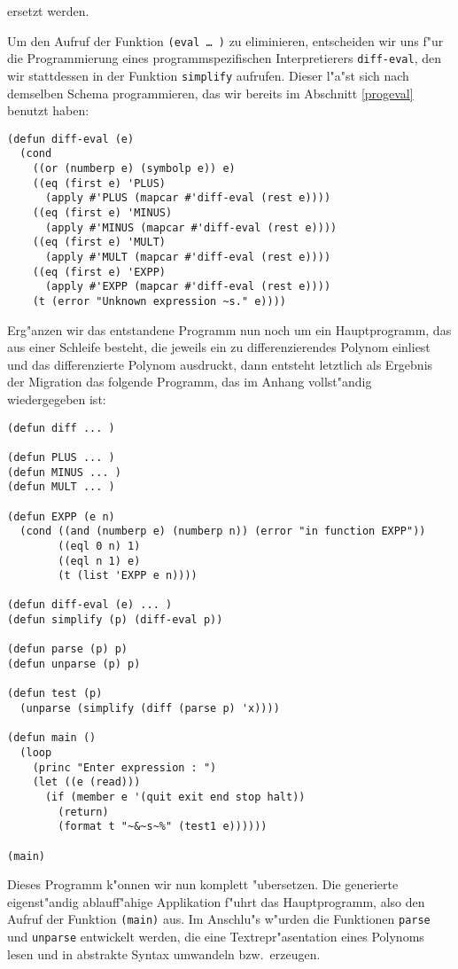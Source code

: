 ersetzt werden.

Um den Aufruf der Funktion {\tt (eval\,\ldots\,)} zu eliminieren,
entscheiden wir uns f"ur die Programmierung eines programmspezifischen
Interpretierers {\tt diff-eval}, den wir stattdessen in der Funktion
{\tt simplify} aufrufen. Dieser l"a"st sich nach demselben
Schema programmieren, das wir bereits im Abschnitt \ref{progeval} benutzt
haben:

\begin{verbatim}
(defun diff-eval (e)
  (cond 
    ((or (numberp e) (symbolp e)) e)
    ((eq (first e) 'PLUS) 
      (apply #'PLUS (mapcar #'diff-eval (rest e))))
    ((eq (first e) 'MINUS) 
      (apply #'MINUS (mapcar #'diff-eval (rest e))))
    ((eq (first e) 'MULT) 
      (apply #'MULT (mapcar #'diff-eval (rest e))))
    ((eq (first e) 'EXPP) 
      (apply #'EXPP (mapcar #'diff-eval (rest e))))
    (t (error "Unknown expression ~s." e))))
\end{verbatim}

Erg"anzen wir das entstandene Programm nun noch um ein Hauptprogramm, das aus
einer Schleife besteht, die jeweils ein zu differenzierendes Polynom einliest
und das differenzierte Polynom ausdruckt, dann entsteht letztlich als
Ergebnis der Migration das folgende Programm, das im Anhang vollst"andig
wiedergegeben ist:

\begin{verbatim}
(defun diff ... )

(defun PLUS ... )
(defun MINUS ... )
(defun MULT ... )

(defun EXPP (e n)
  (cond ((and (numberp e) (numberp n)) (error "in function EXPP"))
        ((eql 0 n) 1)
        ((eql n 1) e)
        (t (list 'EXPP e n))))

(defun diff-eval (e) ... )
(defun simplify (p) (diff-eval p))

(defun parse (p) p)
(defun unparse (p) p)

(defun test (p)
  (unparse (simplify (diff (parse p) 'x))))

(defun main ()
  (loop 
    (princ "Enter expression : ")
    (let ((e (read))) 
      (if (member e '(quit exit end stop halt)) 
        (return) 
        (format t "~&~s~%" (test1 e))))))

(main)
\end{verbatim}

Dieses Programm k"onnen wir nun komplett "ubersetzen. Die generierte
eigenst"andig ablauf\/f"ahige Applikation f"uhrt das Hauptprogramm, also den
Aufruf der Funktion {\tt (main)} aus. Im Anschlu"s w"urden die
Funktionen {\tt parse} und {\tt unparse} entwickelt werden, die eine
Textrepr"asentation eines Polynoms lesen und in abstrakte Syntax
umwandeln bzw.\ erzeugen.

